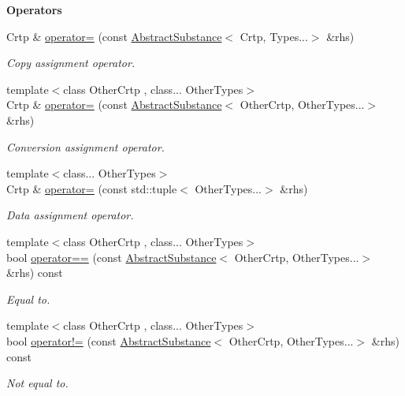 \begin{Indent}{\bf Operators}\par
\begin{DoxyCompactItemize}
\item 
Crtp \& \hyperlink{classmagrathea_1_1AbstractSubstance_a41db7a6475fbb0e52d9dbc814ba1da79}{operator=} (const \hyperlink{classmagrathea_1_1AbstractSubstance}{Abstract\-Substance}$<$ Crtp, Types...$>$ \&rhs)
\begin{DoxyCompactList}\small\item\em Copy assignment operator. \end{DoxyCompactList}\item 
{\footnotesize template$<$class Other\-Crtp , class... Other\-Types$>$ }\\Crtp \& \hyperlink{classmagrathea_1_1AbstractSubstance_a071e66e051cb94b64d8a722e72fb78c5}{operator=} (const \hyperlink{classmagrathea_1_1AbstractSubstance}{Abstract\-Substance}$<$ Other\-Crtp, Other\-Types...$>$ \&rhs)
\begin{DoxyCompactList}\small\item\em Conversion assignment operator. \end{DoxyCompactList}\item 
{\footnotesize template$<$class... Other\-Types$>$ }\\Crtp \& \hyperlink{classmagrathea_1_1AbstractSubstance_a22c0036514071f03fe414cf2d615410d}{operator=} (const std\-::tuple$<$ Other\-Types...$>$ \&rhs)
\begin{DoxyCompactList}\small\item\em Data assignment operator. \end{DoxyCompactList}\item 
{\footnotesize template$<$class Other\-Crtp , class... Other\-Types$>$ }\\bool \hyperlink{classmagrathea_1_1AbstractSubstance_a128320f85f47a41cf71c0d10d8369878}{operator==} (const \hyperlink{classmagrathea_1_1AbstractSubstance}{Abstract\-Substance}$<$ Other\-Crtp, Other\-Types...$>$ \&rhs) const 
\begin{DoxyCompactList}\small\item\em Equal to. \end{DoxyCompactList}\item 
{\footnotesize template$<$class Other\-Crtp , class... Other\-Types$>$ }\\bool \hyperlink{classmagrathea_1_1AbstractSubstance_ac5e79c15224487e3bfa4806995fea123}{operator!=} (const \hyperlink{classmagrathea_1_1AbstractSubstance}{Abstract\-Substance}$<$ Other\-Crtp, Other\-Types...$>$ \&rhs) const 
\begin{DoxyCompactList}\small\item\em Not equal to. \end{DoxyCompactList}\end{DoxyCompactItemize}
\end{Indent}
